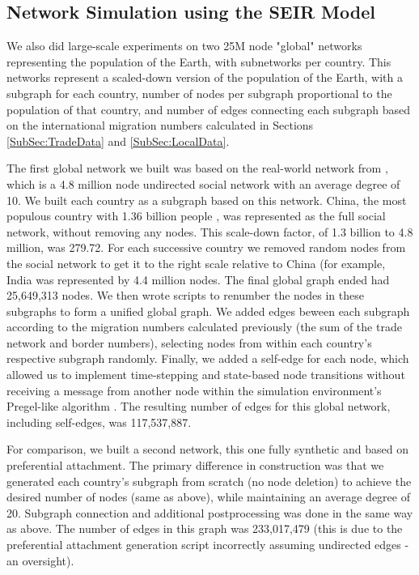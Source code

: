 \documentclass[10pt, journal,onecolumn]{IEEEtran}
\begin{document}
\subsection{{Network Simulation using the SEIR Model}}
\label{SubSec:GraphX}

We also did large-scale experiments on two 25M node "global" networks representing the population
of the Earth, with subnetworks per country. This networks represent a scaled-down version of the
population of the Earth, with a subgraph for each country, number of nodes per subgraph proportional
to the population of that country, and number of edges connecting each subgraph based on the
international migration numbers calculated in Sections \ref{SubSec:TradeData} and \ref{SubSec:LocalData}.

The first global network we built was based on the real-world network from \citep{topcoderdata},
which is a 4.8 million node undirected social network with an average degree of 10. We built each country
as a subgraph based on this network. China, the most populous country with 1.36 billion people
\citep{ciapopulation}, was represented as the full social network, without removing any nodes.
This scale-down factor, of 1.3 billion to 4.8 million, was 279.72.
For each successive country we removed random
nodes from the social network to get it to the right scale relative to China (for example, India
was represented by 4.4 million nodes. The final global graph ended had 25,649,313 nodes.
We then wrote scripts to renumber the nodes in these subgraphs to form a unified global graph.
We added edges beween each subgraph according to the migration numbers calculated previously
(the sum of the trade network and border numbers),
selecting nodes from within each country's respective subgraph randomly.
Finally, we added a self-edge for each node, which allowed us to implement time-stepping and
state-based node transitions without receiving a message from another node within the simulation
environment's Pregel-like algorithm \citep{malewicz2010pregel}.
The resulting number of edges for this global network, including self-edges, was 117,537,887.

For comparison, we built a second network, this one fully synthetic and based on preferential attachment.
The primary difference in construction was that we generated each country's subgraph from scratch
(no node deletion) to achieve the desired number of nodes (same as above), while maintaining an average
degree of 20. Subgraph connection and additional postprocessing was done in the same way as above.
The number of edges in this graph was 233,017,479 (this is due to the preferential attachment generation
script incorrectly assuming undirected edges - an oversight).
\end{document}
